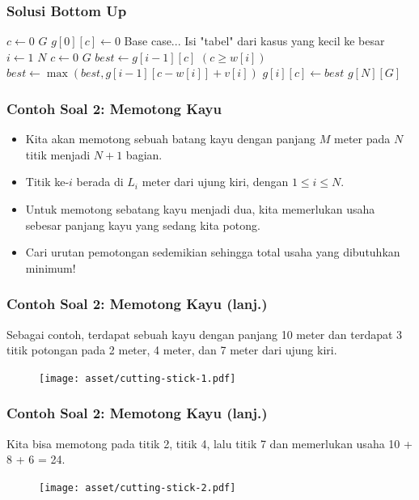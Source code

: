 \begin{frame}
\frametitle{Solusi Bottom Up}
\begin{codebox}
\li \For $c \gets 0$ \To $G$ \Do
\li   $g[0][c] \gets 0$ \Comment Base case...
    \End
\zi
\li \Comment Isi "tabel" dari kasus yang kecil ke besar
\li \For $i \gets 1$ \To $N$ \Do
\li   \For $c \gets 0$ \To $G$ \Do
\li     $best \gets g[i-1][c]$
\li     \If $(c \geq w[i])$ \Then
\li       $best \gets \max(best, g[i - 1][c-w[i]] + v[i])$
        \End  
\li     $g[i][c] \gets best$
      \End
    \End    
\li \Return $g[N][G]$
    \End
\end{codebox}
\end{frame}

\begin{frame}
\frametitle{Contoh Soal 2: Memotong Kayu }
\begin{itemize}
  \item Kita akan memotong sebuah batang kayu dengan panjang $M$ meter pada $N$ titik menjadi $N+1$ bagian.
  \item Titik ke-$i$ berada di $L_i$ meter dari ujung kiri, dengan $1 \leq i \leq N$.
  \item Untuk memotong sebatang kayu menjadi dua, kita memerlukan usaha \alert{sebesar panjang kayu yang sedang kita potong}.
  \item Cari urutan pemotongan sedemikian sehingga total usaha yang dibutuhkan minimum!
\end{itemize}
\end{frame}

\begin{frame}
\frametitle{Contoh Soal 2: Memotong Kayu (lanj.)}
Sebagai contoh, terdapat sebuah kayu dengan panjang 10 meter dan terdapat 3 titik potongan pada 2 meter, 4 meter, dan 7 meter dari ujung kiri.
\begin{figure}
  \texttt{[image: asset/cutting-stick-1.pdf]}
\end{figure}
\end{frame}

\begin{frame}
\frametitle{Contoh Soal 2: Memotong Kayu (lanj.)}
Kita bisa memotong pada titik 2, titik 4, lalu titik 7 dan memerlukan usaha 10 + 8 + 6 = 24.
\begin{figure}
  \texttt{[image: asset/cutting-stick-2.pdf]}
\end{figure}
\end{frame}

